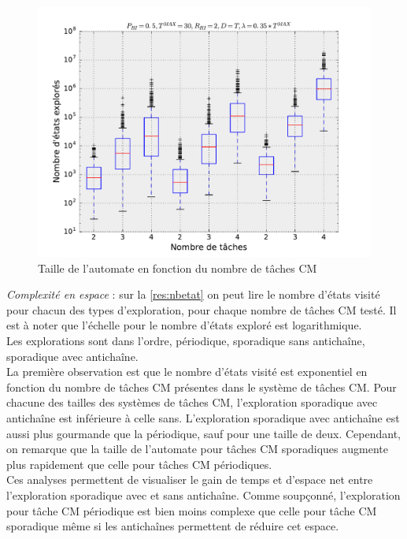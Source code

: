 \documentclass[12pt,a4paper,oneside]{book}
\theoremstyle{break}
\theoremstyle{breakplain}
\begin{document}
\begin{figure}[h]
\includegraphics[width=\textwidth]{./results/taskvssize.pdf}
\caption{Taille de l'automate en fonction du nombre de tâches CM}
\label{res:nbetat}
\end{figure}

\textit{Complexité en espace} : sur la \autoref{res:nbetat} on peut lire le nombre d'états visité pour chacun des types d'exploration, pour chaque nombre de tâches CM testé. Il est à noter que l'échelle pour le nombre d'états exploré est logarithmique.\\
Les explorations sont dans l'ordre, périodique, sporadique sans antichaîne, sporadique avec antichaîne.\\
La première observation est que le nombre d'états visité est exponentiel en fonction du nombre de tâches CM présentes dans le système de tâches CM. Pour chacune des tailles des systèmes de tâches CM, l'exploration sporadique avec antichaîne est inférieure à celle sans. L'exploration sporadique avec antichaîne est aussi plus gourmande que la périodique, sauf pour une taille de deux. Cependant, on remarque que la taille de l'automate pour tâches CM sporadiques augmente plus rapidement que celle pour tâches CM périodiques.\\

Ces analyses permettent de visualiser le gain de temps et d'espace net entre l'exploration sporadique avec et sans antichaîne. Comme soupçonné, l'exploration pour tâche CM périodique est bien moins complexe que celle pour tâche CM sporadique même si les antichaînes permettent de réduire cet espace.\\
\end{document}
